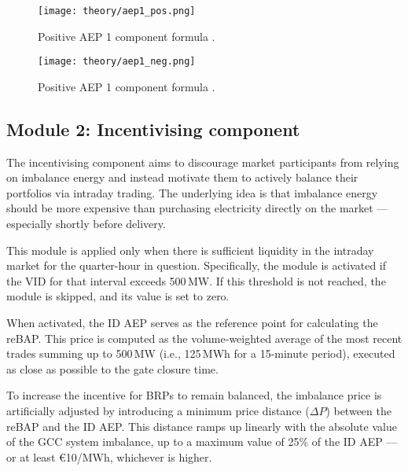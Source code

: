 \documentclass[class=scrbook, crop=false]{standalone}
\begin{document}
\begin{figure}[ht]
            \centering
            \texttt{[image: theory/aep1\_pos.png]}
            \caption[Positive AEP 1 component formula]{Positive AEP 1 component formula \cite{NetztransparenzReBAP}.}
            \label{fig::aep1_pos}
 \end{figure}
 
 

 \begin{figure}[ht]
            \centering
            \texttt{[image: theory/aep1\_neg.png]}
             \caption[Positive AEP 1 component formula]{Positive AEP 1 component formula \cite{NetztransparenzReBAP}.}
            \label{fig::aep1_neg}
 \end{figure}


\subsection{Module 2: Incentivising component}
\label{Section::Module_2}
The incentivising component aims to discourage market participants from relying on imbalance energy and instead motivate them to actively balance their portfolios via intraday trading. The underlying idea is that imbalance energy should be more expensive than purchasing electricity directly on the market — especially shortly before delivery.

This module is applied only when there is sufficient liquidity in the intraday market for the quarter-hour in question. Specifically, the module is activated if the \gls{VID} for that interval exceeds 500 MW. If this threshold is not reached, the module is skipped, and its value is set to zero.

When activated, the \gls{ID AEP} serves as the reference point for calculating the \gls{reBAP}. This price is computed as the volume-weighted average of the most recent trades summing up to 500 MW (i.e., 125 MWh for a 15-minute period), executed as close as possible to the gate closure time.

To increase the incentive for \gls{BRP}s to remain balanced, the imbalance price is artificially adjusted by introducing a minimum price distance ($\Delta P$) between the \gls{reBAP} and the \gls{ID AEP}. This distance ramps up linearly with the absolute value of the \gls{GCC} system imbalance, up to a maximum value of 25\% of the \gls{ID AEP} — or at least €10/MWh, whichever is higher.
\end{document}
